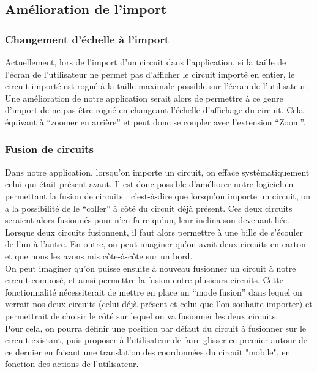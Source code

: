 \documentclass{report}
\begin{document}
\subsection{Amélioration de l'import}

\subsubsection{Changement d'échelle à l'import}

Actuellement, lors de l’import d’un circuit dans l’application, si la taille de l’écran de l’utilisateur ne permet  pas d’afficher le circuit importé en entier, le circuit importé est rogné à la taille maximale possible sur l’écran de l’utilisateur. Une amélioration de notre application serait alors de permettre à ce genre d’import de ne pas être rogné en changeant l’échelle d’affichage du circuit. Cela équivaut à “zoomer en arrière” et peut donc se coupler avec l’extension “Zoom”.

\subsubsection{Fusion de circuits}

Dans notre application, lorsqu’on importe un circuit, on efface systématiquement celui qui était présent avant. Il est donc possible d’améliorer notre logiciel en permettant la fusion de circuits : c’est-à-dire que lorsqu’on importe un circuit, on a la possibilité de le “coller” à côté du circuit déjà présent. Ces deux circuits seraient alors fusionnés pour n’en faire qu’un, leur inclinaison devenant liée. Lorsque deux circuits fusionnent, il faut alors permettre à une bille de s’écouler de l’un à l’autre. En outre, on peut imaginer qu’on avait deux circuits en carton et que nous les avons mis côte-à-côte sur un bord. \\

\newpage
On peut imaginer qu’on puisse ensuite à nouveau fusionner un circuit à notre circuit composé, et ainsi permettre la fusion entre plusieurs circuits.
Cette fonctionnalité nécessiterait de mettre en place un “mode fusion” dans lequel on verrait nos deux circuits (celui déjà présent et celui que l’on souhaite importer) et permettrait de choisir le côté sur lequel on va fusionner les deux circuits. \\

Pour cela, on pourra définir une position par défaut du circuit à fusionner sur le circuit existant, puis proposer à l'utilisateur de faire glisser ce premier autour de ce dernier en faisant une translation des coordonnées du circuit "mobile", en fonction des actions de l'utilisateur. \\
\end{document}
